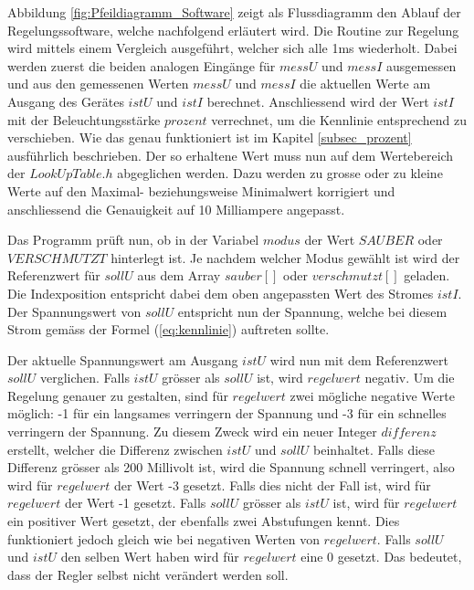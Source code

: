 Abbildung \ref{fig:Pfeildiagramm_Software} zeigt als Flussdiagramm den Ablauf der Regelungssoftware, welche nachfolgend erläutert wird. Die Routine zur Regelung wird mittels einem Vergleich ausgeführt, welcher sich alle 1ms wiederholt. Dabei werden zuerst die beiden analogen Eingänge für $messU$ und $messI$ ausgemessen und aus den gemessenen Werten $messU$ und $messI$ die aktuellen Werte am Ausgang des Gerätes $istU$ und $istI$ berechnet. \newline
Anschliessend wird der Wert $istI$ mit der Beleuchtungsstärke $prozent$ verrechnet, um die Kennlinie entsprechend zu verschieben. Wie das genau funktioniert ist im Kapitel \ref{subsec_prozent} ausführlich beschrieben. \newline
Der so erhaltene Wert muss nun auf dem Wertebereich der $LookUpTable.h$ abgeglichen werden. Dazu werden zu grosse oder zu kleine Werte auf den Maximal- beziehungsweise Minimalwert korrigiert und anschliessend die Genauigkeit auf 10 Milliampere angepasst.

Das Programm prüft nun, ob in der Variabel $modus$ der Wert $SAUBER$ oder $VERSCHMUTZT$ hinterlegt ist. Je nachdem welcher Modus gewählt ist wird der Referenzwert für $sollU$ aus dem Array $sauber[]$ oder $verschmutzt[]$ geladen. Die Indexposition entspricht dabei dem oben angepassten Wert des Stromes $istI$. Der Spannungswert von $sollU$ entspricht nun der Spannung, welche bei diesem Strom gemäss der Formel (\ref{eq:kennlinie}) auftreten sollte.

Der aktuelle Spannungswert am Ausgang $istU$ wird nun mit dem Referenzwert $sollU$ verglichen. Falls $istU$ grösser als $sollU$ ist, wird $regelwert$ negativ. Um die Regelung genauer zu gestalten, sind für $regelwert$ zwei mögliche negative Werte möglich: -1 für ein langsames verringern der Spannung und -3 für ein schnelles verringern der Spannung. Zu diesem Zweck wird ein neuer Integer $differenz$ erstellt, welcher die Differenz zwischen $istU$ und $sollU$ beinhaltet. Falls diese Differenz grösser als 200 Millivolt ist, wird die Spannung schnell verringert, also wird für $regelwert$ der Wert -3 gesetzt. Falls dies nicht der Fall ist, wird für $regelwert$ der Wert -1 gesetzt. \newline
Falls $sollU$ grösser als $istU$ ist, wird für $regelwert$ ein positiver Wert gesetzt, der ebenfalls zwei Abstufungen kennt. Dies funktioniert jedoch gleich wie bei negativen Werten von $regelwert$. \newline
Falls $sollU$ und $istU$ den selben Wert haben wird für $regelwert$ eine 0 gesetzt. Das bedeutet, dass der Regler selbst nicht verändert werden soll.

